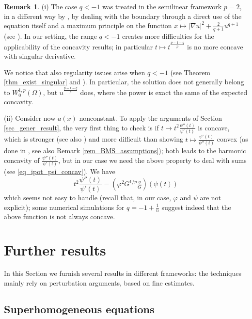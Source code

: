 \documentclass[11pt, reqno]{amsart}
\theoremstyle{definition}
\newtheorem{remark}[lemma]{Remark}
\numberwithin{equation}{section}
\begin{document}
\begin{remark}
\label{rem_comp_singular}
(i) The case $q < -1$ was treated in the semilinear framework $p=2$, in a different way by \cite{BGP99}, by dealing with the boundary through a direct use of the equation itself and a maximum principle on the function $x \mapsto |\nabla u|^2 + \frac{2}{q+1} u^{q+1}$ (see \cite[Lemmas 3.1 and 3.3]{BGP99}). 
In our setting, the range $q < -1$ creates more difficulties for the applicability of the concavity results; in particular $t \mapsto t^{\frac{p-1-q}{p}}$ is no more concave with singular derivative.

We notice that also regularity issues arise when $q < -1$ (see Theorem \ref{thm_exist_singular} and \cite{CES19, Gua21}). 
In particular, the solution does not generally belong to $W^{1,p}_0(\Omega)$, but $u^{\frac{p-1-q}{p}}$ does, where the power is exact the same of the expected concavity.

(ii) Consider now $a(x)$ nonconstant. To apply the arguments of Section \ref{sec_gener_result}, the very first thing to check is if $t \mapsto t^2 \frac{\psi''(t)}{\psi'(t)}$ is concave, which is stronger (see also \cite[Proposition B.3]{GMrS25}) and more difficult than showing $t \mapsto \frac{\psi'(t)}{\psi''(t)}$ convex (as done in \cite{BMS22}, see also Remark \ref{rem_BMS_assumptions}); both leads to the harmonic concavity of $ \frac{\psi''(t)}{\psi'(t)}$, but in our case we need the above property to deal with sums (see \eqref{eq_ipot_psi_concav}). 
We have
$$t^2 \frac{\psi''(t)}{\psi'(t)} = \left( \varphi^2 G^{1/p} \tfrac{g}{G}\right)(\psi(t))$$
which seems not easy to handle (recall that, in our case, $\varphi$ and $\psi$ are not explicit);
some numerical simulations for $q=-1+\frac{1}{n}$ suggest indeed that the above function is not always concave.
\end{remark}


\section{Further results}
\label{sec_further_results}

In this Section we furnish several results in different frameworks: the techniques mainly rely on perturbation arguments, based on fine estimates.


\subsection{Superhomogeneous equations}
\label{sec_superhomog}
\end{document}

